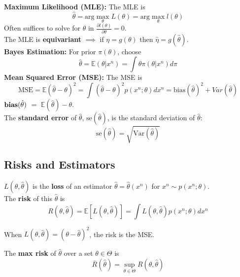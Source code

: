 \documentclass[10pt,twocolumn]{article}
\begin{document}
\textbf{Maximum Likelihood (MLE):} The MLE is
\begin{equation}
\hat{\theta} = \text{arg}\max_{\theta} L(\theta) = \text{arg}\max_{\theta} l(\theta)
\end{equation}
Often suffices to solve for $\theta$ in $\frac{\partial l(\theta)}{\partial \theta} = 0$.\\
The MLE is \textbf{equivariant} $\implies$ if $\eta = g(\theta)$ then $\hat{\eta} = g(\hat{\theta})$. \\
\textbf{Bayes Estimation:} For prior $\pi(\theta)$, choose 
\begin{equation}
    \hat{\theta} = \mathbb{E}(\theta|x^{n}) = \int \theta \pi(\theta|x^{n}) d\pi
\end{equation}
\textbf{Mean Squared Error (MSE):} The MSE is
\begin{equation}
    \text{MSE} = \mathbb{E}(\hat{\theta} - \theta)^{2} = \int (\hat{\theta}-\theta)^{2} p(x^{n};\theta)dx^{n} = \text{bias}({\hat{\theta}})^{2} + Var(\hat{\theta})
\end{equation}
$\text{\textbf{bias}}(\hat{\theta})$ $=$ $\mathbb{E}(\hat{\theta}) - \theta$.\\
The \textbf{standard error} of $\hat{\theta}$, $\text{se}(\hat{\theta})$, is the standard deviation of $\hat{\theta}$:\\
\begin{equation}
    \text{se}(\hat{\theta}) = \sqrt{\text{Var}(\hat{\theta})}
\end{equation}

\subsection*{Risks and Estimators}
$L(\theta,\hat{\theta})$ is the \textbf{loss} of an estimator $\hat{\theta} = \hat{\theta}(x^{n})$ for $x^{n} \sim p(x^{n};\theta)$.\\
The \textbf{risk} of this $\hat{\theta}$ is
\begin{equation}
    R(\theta,\hat{\theta}) = \mathbb{E}[L(\theta,\hat{\theta})] = \int L(\theta,\hat{\theta}) p(x^{n};\theta) dx^{n}
\end{equation}

When $L(\theta,\hat{\theta}) = (\theta-\hat{\theta})^{2}$, the risk is the MSE.

The \textbf{max risk} of $\hat{\theta}$ over a set $\theta \in \Theta$ is
\begin{equation}
    \overline{R}(\hat{\theta}) = \sup_{\theta \in \Theta} R(\theta,\hat{\theta})
\end{equation}
\end{document}
